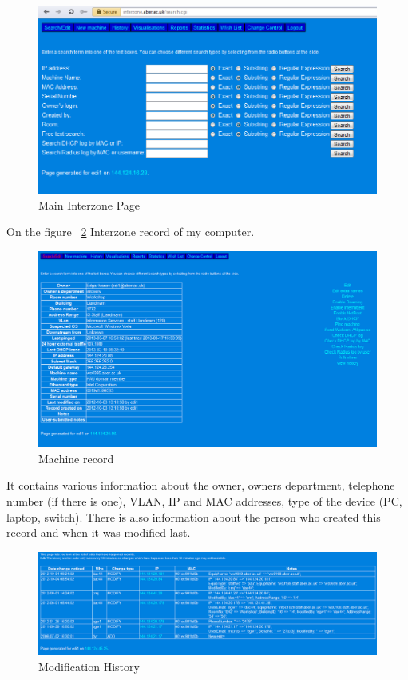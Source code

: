 \documentclass[10pt,a4paper,headinclude=true]{report}
\begin{document}
\begin{figure}[H]
\centering
\centerline{\includegraphics[scale=0.5]{./main_interzone_page}}
\caption{Main Interzone Page}
\label{fig:main_interzone_page}
\end{figure}

On the figure ~\ref{fig:machine_record} Interzone record of my computer.

\begin{figure}[H]
\centering
\centerline{\includegraphics[scale=0.5]{./machine_record}}
\caption{Machine record}
\label{fig:machine_record}
\end{figure}

It contains various information about the owner, owners department, telephone number (if there is one), VLAN, IP and MAC addresses, type of the device (PC, laptop, switch). There is also information about the person who created this record and when it was modified last.

\begin{figure}[H]
\centering
\centerline{\includegraphics[scale=0.5]{./modification_history}}
\caption{Modification History}
\label{fig:modification_history}
\end{figure}
\end{document}
